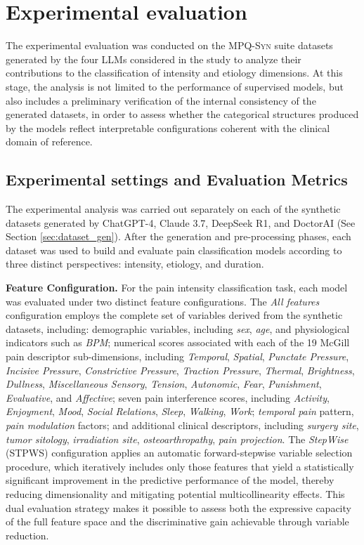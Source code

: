 \documentclass[preprint,12pt,authoryear]{elsarticle}
\newcommand{\dbsuite}{\small\textsc{MPQ-Syn}\xspace}
\begin{document}
\section{Experimental evaluation\label{sec:evaluation}}
The experimental evaluation was conducted on the \dbsuite suite datasets generated by the four LLMs considered in the study to analyze their contributions to the classification of intensity and etiology dimensions. At this stage, the analysis is not limited to the performance of supervised models, but also includes a preliminary verification of the internal consistency of the generated datasets, in order to assess whether the categorical structures produced by the models reflect interpretable configurations coherent with the clinical domain of reference.

\subsection{Experimental settings and Evaluation Metrics}
The experimental analysis was carried out separately on each of the synthetic datasets generated by ChatGPT-4, Claude 3.7, DeepSeek R1, and DoctorAI (See Section \ref{sec:dataset_gen}). After the generation and pre-processing phases, each dataset was used to build and evaluate pain classification models according to three distinct perspectives: intensity, etiology, and duration.

\textbf{Feature Configuration.} For the pain intensity classification task, each model was evaluated under two distinct feature configurations. The \textit{All features} configuration employs the complete set of variables derived from the synthetic datasets, including: demographic variables, including \textit{sex}, \textit{age}, and physiological indicators such as \textit{BPM}; numerical scores associated with each of the 19 McGill pain descriptor sub-dimensions, including \textit{Temporal}, \textit{Spatial}, \textit{Punctate Pressure}, \textit{Incisive Pressure}, \textit{Constrictive Pressure}, \textit{Traction Pressure}, \textit{Thermal}, \textit{Brightness}, \textit{Dullness}, \textit{Miscellaneous Sensory}, \textit{Tension}, \textit{Autonomic}, \textit{Fear}, \textit{Punishment}, \textit{Evaluative}, and \textit{Affective}; seven pain interference scores, including \textit{Activity}, \textit{Enjoyment}, \textit{Mood}, \textit{Social Relations}, \textit{Sleep}, \textit{Walking}, \textit{Work}; \textit{temporal pain} pattern, \textit{pain modulation} factors; and additional clinical descriptors, including \textit{surgery site}, \textit{tumor sitology}, \textit{irradiation site}, \textit{osteoarthropathy}, \textit{pain projection}. The \textit{StepWise} (STPWS) configuration applies an automatic forward-stepwise variable selection procedure, which iteratively includes only those features that yield a statistically significant improvement in the predictive performance of the model, thereby reducing dimensionality and mitigating potential multicollinearity effects. This dual evaluation strategy makes it possible to assess both the expressive capacity of the full feature space and the discriminative gain achievable through variable reduction.
\end{document}
